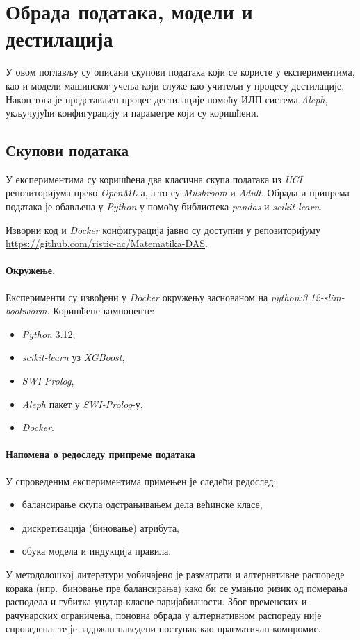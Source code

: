 \section{Обрада података, модели и дестилација}

У овом поглављу су описани скупови података који се користе у експериментима, као и модели машинског учења који служе као учитељи у процесу дестилације. Након тога је представљен процес дестилације помоћу ИЛП система \textit{Aleph}, укључујући конфигурацију и параметре који су коришћени.

\subsection{Скупови података}

У експериментима су коришћена два класична скупа података из \emph{UCI} репозиторијума преко \emph{OpenML}-а, а то су \emph{Mushroom} и \emph{Adult}. Обрада и припрема података је обављена у \emph{Python}-у помоћу библиотека \emph{pandas} и \emph{scikit-learn}.

Изворни код и \emph{Docker} конфигурација јавно су доступни у репозиторијуму \url{https://github.com/ristic-ac/Matematika-DAS}.

\paragraph{Окружење.}
Експерименти су извођени у \emph{Docker} окружењу заснованом на \emph{python:3.12-slim-bookworm}. Коришћене компоненте:
\begin{itemize}
  \item \emph{Python} 3.12,
  \item \emph{scikit-learn} уз \emph{XGBoost},
  \item \emph{SWI-Prolog},
  \item \emph{Aleph} пакет у \emph{SWI-Prolog}-у,
  \item \emph{Docker}.
\end{itemize}

\paragraph{Напомена о редоследу припреме података}
У спроведеним експериментима примењен је следећи редослед:
\begin{itemize}
  \item балансирање скупа одстрањивањем дела већинске класе,
  \item дискретизација (биновање) атрибута,
  \item обука модела и индукција правила.
\end{itemize}
У методолошкој литератури уобичајено је разматрати и алтернативне распореде корака (нпр.\ биновање пре балансирања) како би се умањио ризик од померања расподела и губитка унутар-класне варијабилности. Због временских и рачунарских ограничења, поновна обрада у алтернативном распореду није спроведена, те је задржан наведени поступак као прагматичан компромис.

